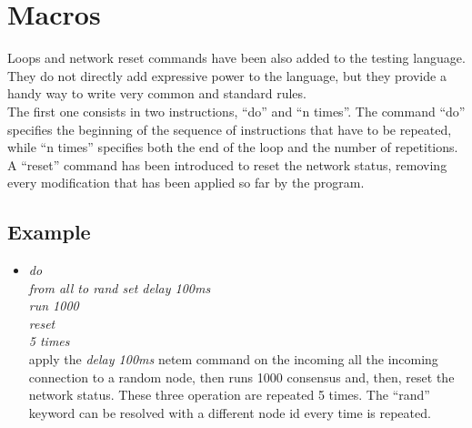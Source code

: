 \section{Macros}
Loops and network reset commands have been also added to the testing language. They do not directly add expressive power to the language, but they provide a handy way to write very common and standard rules.\\
The first one consists in two instructions, “do” and “n times”. The command “do” specifies the beginning of the sequence of instructions that have to be repeated, while “n times” specifies both the end of the loop and the number of repetitions.\\
A “reset” command has been introduced to reset the network status, removing every modification that has been applied so far by the program.

\subsection{Example}
\begin{itemize}
  \item 
  \emph{do\\
    \tab from all to rand set delay 100ms\\
    \tab run 1000\\
    \tab reset\\
  5 times}\\
  apply the \emph{delay 100ms} netem command on the incoming all the incoming connection to a random node, then runs 1000 consensus and, then, reset the network status. These three operation are repeated 5 times. The “rand” keyword can be resolved with a different node id every time is repeated.
\end{itemize}